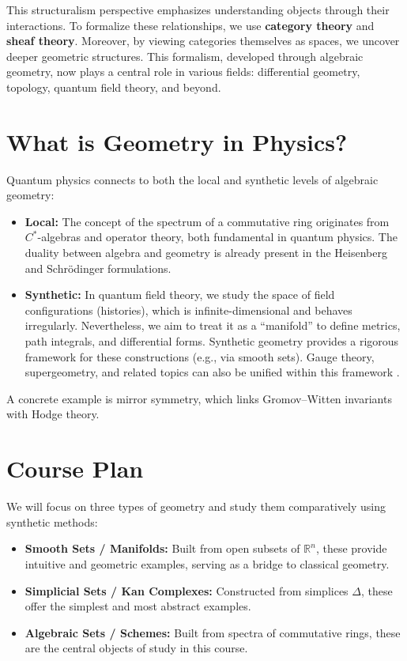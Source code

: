 This structuralism perspective emphasizes understanding objects through their interactions. To formalize these relationships, we use \textbf{category theory} and \textbf{sheaf theory}. Moreover, by viewing categories themselves as spaces, we uncover deeper geometric structures. This formalism, developed through algebraic geometry, now plays a central role in various fields: differential geometry, topology, quantum field theory, and beyond.

\section{What is Geometry in Physics?}

Quantum physics connects to both the local and synthetic levels of algebraic geometry:

\begin{itemize}
  \item \textbf{Local:} The concept of the spectrum of a commutative ring originates from $C^*$-algebras and operator theory, both fundamental in quantum physics. The duality between algebra and geometry is already present in the Heisenberg and Schrödinger formulations.

  \item \textbf{Synthetic:} In quantum field theory, we study the space of field configurations (histories), which is infinite-dimensional and behaves irregularly. Nevertheless, we aim to treat it as a “manifold” to define metrics, path integrals, and differential forms. Synthetic geometry provides a rigorous framework for these constructions (e.g., via smooth sets). Gauge theory, supergeometry, and related topics can also be unified within this framework \cite{nlab:geometry_of_physics}.
\end{itemize}

A concrete example is mirror symmetry, which links Gromov–Witten invariants with Hodge theory.

\section{Course Plan}

We will focus on three types of geometry and study them comparatively using synthetic methods:

\begin{itemize}
  \item \textbf{Smooth Sets / Manifolds:} Built from open subsets of $\mathbb{R}^n$, these provide intuitive and geometric examples, serving as a bridge to classical geometry.

  \item \textbf{Simplicial Sets / Kan Complexes:} Constructed from simplices $\Delta$, these offer the simplest and most abstract examples.

  \item \textbf{Algebraic Sets / Schemes:} Built from spectra of commutative rings, these are the central objects of study in this course.
\end{itemize}
